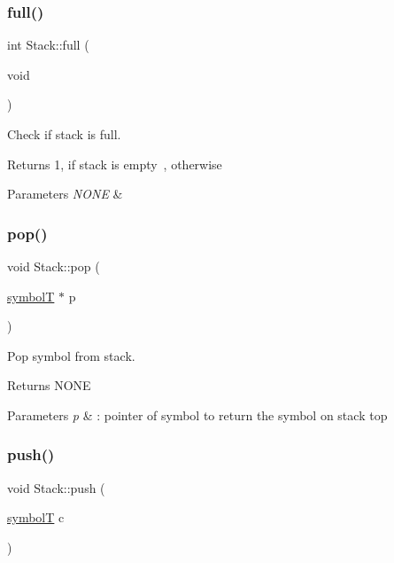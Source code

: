 \subsubsection{\texorpdfstring{full()}{full()}}
{\footnotesize\ttfamily int Stack\+::full (\begin{DoxyParamCaption}\item[{void}]{ }\end{DoxyParamCaption})}



Check if stack is full. 

\begin{DoxyReturn}{Returns}
1, if stack is empty~, otherwise
\end{DoxyReturn}

\begin{DoxyParams}{Parameters}
{\em N\+O\+NE} & \\
\hline
\end{DoxyParams}
\mbox{\label{classStack_a220c17d4bafbab660762be294d39c3eb}} 
\subsubsection{\texorpdfstring{pop()}{pop()}}
{\footnotesize\ttfamily void Stack\+::pop (\begin{DoxyParamCaption}\item[{\hyperlink{structsymbolT}{symbolT} $\ast$}]{p }\end{DoxyParamCaption})}



Pop symbol from stack. 

\begin{DoxyReturn}{Returns}
N\+O\+NE
\end{DoxyReturn}

\begin{DoxyParams}{Parameters}
{\em p} & \+: pointer of symbol to return the symbol on stack top \\
\hline
\end{DoxyParams}
\mbox{\label{classStack_a974a67de02f49899ec9b4a53e6f8d157}} 
\subsubsection{\texorpdfstring{push()}{push()}}
{\footnotesize\ttfamily void Stack\+::push (\begin{DoxyParamCaption}\item[{\hyperlink{structsymbolT}{symbolT}}]{c }\end{DoxyParamCaption})}



